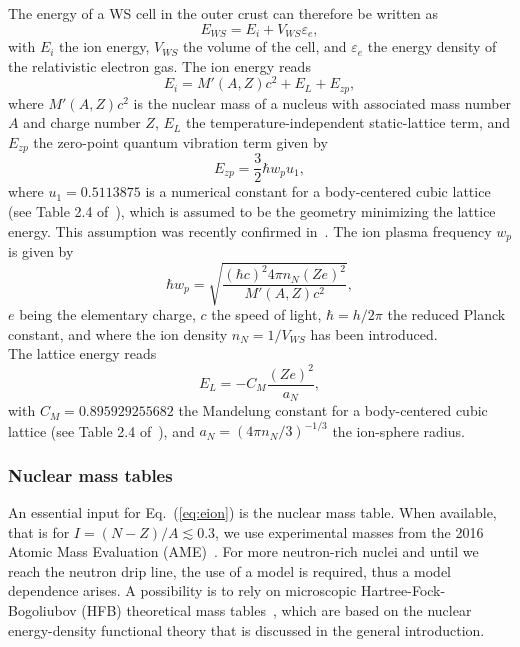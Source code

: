 The energy of a WS cell in the outer crust can therefore be written as
%
\begin{equation}
  E_{WS} = E_i + V_{WS}\varepsilon_e,\label{eq:ews_ocrust}
\end{equation}
%
with $E_i$ the ion energy, $V_{WS}$ the volume of the cell, and $\varepsilon_e$ the 
energy density of the relativistic electron gas.
The ion energy reads
%
\begin{equation}
  E_i = M'(A,Z)c^2 + E_L + E_{zp},\label{eq:eion}
\end{equation}
%
where $M'(A,Z)c^2$ is the nuclear mass of a nucleus with associated mass number 
$A$ and charge number $Z$, $E_L$ the temperature-independent static-lattice 
term, and $E_{zp}$ the zero-point quantum vibration term given by
%
\begin{equation}
  E_{zp} = \frac{3}{2}\hbar w_p u_1,\label{eq:ezp}
\end{equation}
%
where $u_1 = 0.5113875$ is a numerical constant for a body-centered cubic
lattice (see Table 2.4 of~\cite{Haensel2007}), 
which is assumed to be the geometry minimizing the lattice energy. This
assumption was recently confirmed in~\cite{Chamel2016}. The ion
plasma frequency $w_p$ is given by
%
\begin{equation}
  \hbar w_p = \sqrt{\frac{(\hbar c)^2 4\pi n_N (Ze)^2}{M'(A,Z)c^2}},
\end{equation}
%
$e$ being the elementary charge, $c$ the speed of light, $\hbar = h/2\pi$
the reduced Planck constant, and where the ion density $n_N = 1/V_{WS}$ has
been introduced.\\
The lattice energy reads
%
\begin{equation}
  E_L = -C_M \frac{(Ze)^2}{a_N},
\end{equation}
%
with $C_M = 0.895929255682$ the Mandelung constant for a body-centered cubic 
lattice (see Table 2.4 of~\cite{Haensel2007}), and $a_N = (4\pi n_N/3)^{-1/3}$ 
the ion-sphere radius.

\subsubsection{Nuclear mass tables}

An essential input for Eq.~(\ref{eq:eion}) is the nuclear mass table. When
available, that is for $I = (N-Z)/A \lesssim 0.3$, we use experimental masses
from the 2016 Atomic Mass Evaluation (AME)~\cite{Huang2017}. For more neutron-rich
nuclei and until we reach the neutron drip line, the use of a model is
required, thus a model dependence arises. A possibility is to rely on 
microscopic Hartree-Fock-Bogoliubov (HFB) theoretical mass
tables~\cite{Samyn2002}, which are based on the nuclear energy-density 
functional theory that is discussed in the general introduction.

